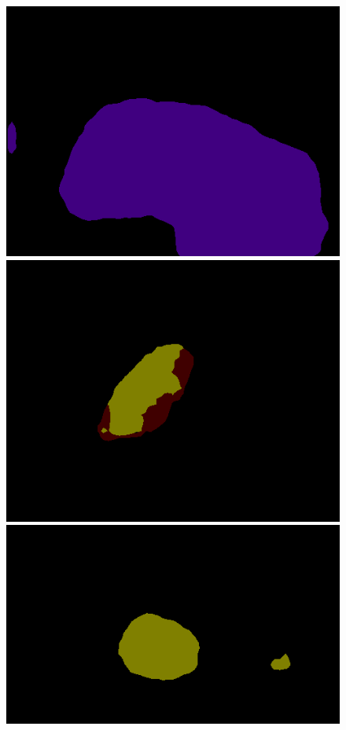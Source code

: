 \documentclass[10pt, a4paper]{article}
\begin{document}
\begin{figure}[h]
\begin{minipage}[b]{0.8\linewidth}
{\begin{minipage}[b]{0.31\linewidth}
        \includegraphics[width=\linewidth]{imgs/r50-2009_003375.png}\vspace{0pt}
        \includegraphics[width=\linewidth]{imgs/r50-2009_003399.png}\vspace{0pt}
        \includegraphics[width=\linewidth]{imgs/r50-2009_004375.png}

\end{minipage}}
\end{minipage}
\end{figure}
\end{document}
